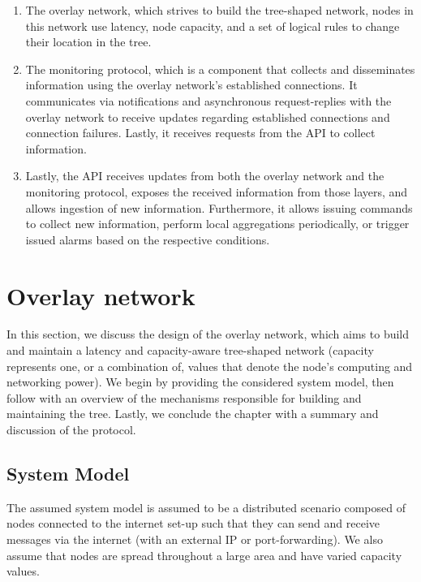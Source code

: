 \begin{enumerate}
    \item The overlay network, which strives to build the tree-shaped network, nodes in this network use latency, node capacity, and a set of logical rules to change their location in the tree.

    \item The monitoring protocol, which is a component that collects and disseminates information using the overlay network's established connections. It communicates via notifications and asynchronous request-replies with the overlay network to receive updates regarding established connections and connection failures. Lastly, it receives requests from the API to collect information.

    \item Lastly, the API receives updates from both the overlay network and the monitoring protocol, exposes the received information from those layers, and allows ingestion of new information. Furthermore, it allows issuing commands to collect new information, perform local aggregations periodically, or trigger issued alarms based on the respective conditions.
\end{enumerate}

\section{Overlay network}

In this section, we discuss the design of the overlay network, which aims to build and maintain a latency and capacity-aware tree-shaped network (capacity represents one, or a combination of, values that denote the node's computing and networking power). We begin by providing the considered system model, then follow with an overview of the mechanisms responsible for building and maintaining the tree. Lastly, we conclude the chapter with a summary and discussion of the protocol.

\subsection{System Model}

The assumed system model is assumed to be a distributed scenario composed of nodes connected to the internet set-up such that they can send and receive messages via the internet (with an external IP or port-forwarding). We also assume that nodes are spread throughout a large area and have varied capacity values.

